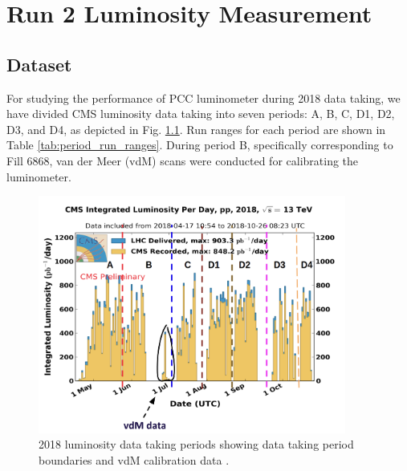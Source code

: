 \chapter{Run 2 Luminosity Measurement}  %

\ifpdf
    \graphicspath{{Chapter4/Figs/Raster/}{Chapter4/Figs/PDF/}{Chapter4/Figs/}}
\else
    \graphicspath{{Chapter4/Figs/Vector/}{Chapter4/Figs/}}
\fi




\section{Dataset}

For studying the performance of PCC luminometer during 2018 data taking, we have divided CMS luminosity data taking into seven periods: A, B, C, D1, D2, D3, and D4, as depicted in %
Fig. \ref{fig:period_bound}. Run ranges for each period are shown in Table \ref{tab:period_run_ranges}.
During period B, specifically corresponding to Fill 6868, van der Meer (vdM) scans were conducted for calibrating the luminometer.

\begin{figure}[!htp]
\centering
\includegraphics[width=0.9\textwidth]{ashish_thesis/period_boundary.png}
\caption[2018 CMS luminosity data taking periods.]{%
   2018 luminosity data taking periods showing data taking period boundaries and vdM calibration data  \cite{CERNLumiPublicResults}.
}
\label{fig:period_bound}
\end{figure}


